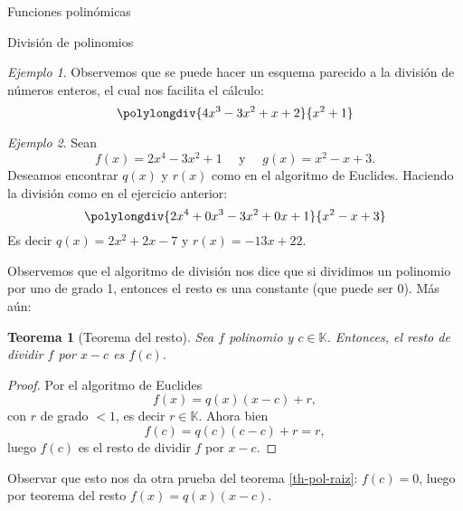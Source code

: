\documentclass[a4paper,12pt,twoside,spanish,reqno]{amsbook}
\numberwithin{equation}{section}
\newtheorem{teorema}{Teorema}[section]
\theoremstyle{definition}
\theoremstyle{remark}
\newtheorem*{ejemplo*}{Ejemplo}
\newcommand{\K}{\mathbb K}
\begin{document}
\begin{chapter}{Funciones polinómicas}
\begin{section}{División de polinomios}
\begin{ejemplo*}
    Observemos que se puede hacer un esquema parecido a  la división de números enteros, el cual nos facilita el cálculo:
    \begin{equation*}
        \polylongdiv{4x^3 - 3x^2 + x + 2}{ x^2 + 1}
    \end{equation*}
\end{ejemplo*}

\begin{ejemplo*}
    Sean
    \begin{equation*}
        f (x) = 2x^4 - 3x^2 + 1 \quad \text{ y } \quad g (x) = x^2 - x + 3.
    \end{equation*}
    Deseamos encontrar $q (x)$ y $r (x)$ como en el algoritmo de Euclides. Haciendo la división como en el ejercicio anterior:
    \begin{equation*}
    \polylongdiv{2x^4 +0x^3- 3x^2 +0x+ 1}{x^2 - x + 3}
    \end{equation*}
    Es decir $q(x) = 2x^2+2x-7$ y $r(x)= -13x+22$.
\end{ejemplo*}

Observemos que el algoritmo de división nos dice que si dividimos un polinomio por uno de grado 1,  entonces el resto es una constante (que puede ser 0). Más aún:

\begin{teorema}[Teorema del  resto] Sea $f$ polinomio y $c \in \K$. Entonces,  el resto de dividir $f$ por $x-c$ es $f(c)$. 
\end{teorema}
\begin{proof} Por  el algoritmo de Euclides
    \begin{equation*}
        f(x) = q(x)(x-c) + r,
    \end{equation*}
    con $r$ de grado $<1$,  es decir $r \in \K$.  Ahora bien
    \begin{equation*}
    f(c) = q(c)(c-c) + r = r,
    \end{equation*}
    luego $f(c)$  es el resto de dividir $f$ por $x-c$. 
\end{proof}

Observar que esto  nos da otra prueba del teorema \ref{th-pol-raiz}: $f(c)=0$, luego por teorema del resto $ f(x)=q(x)(x-c)$. 
        
    \end{section}	
    \end{chapter}	
\end{document}
